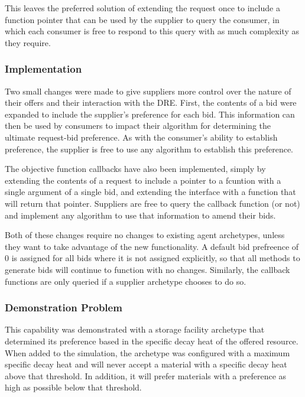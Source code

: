 This leaves the preferred solution of extending the request once to include a
function pointer that can be used by the supplier to query the consumer, in
which each consumer is free to respond to this query with as much complexity
as they require.


\subsubsection{Implementation}

Two small changes were made to give suppliers more control over the nature of
their offers and their interaction with the \gls{DRE}.  First, the contents of
a bid were expanded to include the supplier's preference for each bid.  This
information can then be used by consumers to impact their algorithm for
determining the ultimate request-bid preference.  As with the consumer's
ability to establish preference, the supplier is free to use any algorithm to
establish this preference.

The objective function callbacks have also been implemented, simply by
extending the contents of a request to include a pointer to a fcuntion with a
single argument of a single bid, and extending the interface with a function
that will return that pointer.  Suppliers are free to query the callback
function (or not) and implement any algorithm to use that information to amend
their bids.

Both of these changes require no changes to existing agent archetypes, unless
they want to take advantage of the new functionality.  A default bid
prefreence of 0 is assigned for all bids where it is not assigned explicitly,
so that all methods to generate bids will continue to function with no
changes.  Similarly, the callback functions are only queried if a supplier
archetype chooses to do so.


\subsubsection{Demonstration Problem}


This capability was demonstrated with a storage facility archetype that
determined its preference based in the specific decay heat of the offered
resource.  When added to the simulation, the archetype was configured with a
maximum specific decay heat and will never accept a material with a specific
decay heat above that threshold.  In addition, it will prefer materials with a
preference as high as possible below that threshold.


